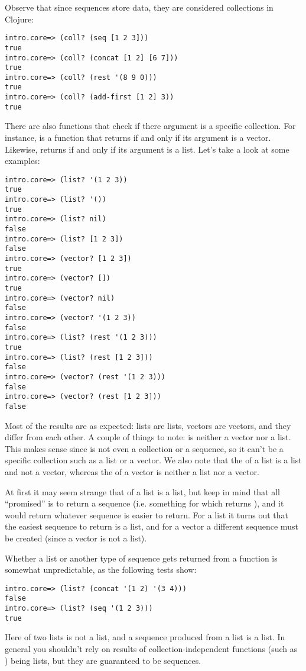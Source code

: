 Observe that since sequences store data, they are considered collections in Clojure:
\begin{framed}
\begin{verbatim}
intro.core=> (coll? (seq [1 2 3]))
true
intro.core=> (coll? (concat [1 2] [6 7]))
true
intro.core=> (coll? (rest '(8 9 0)))
true
intro.core=> (coll? (add-first [1 2] 3))
true
\end{verbatim}
\end{framed} 
There are also functions that check if there argument is a specific collection. For instance,  is a function that returns  if and only if its argument is a vector. Likewise,  returns  if and only if its argument is a list. Let's take a look at some examples:
\begin{framed}
\begin{verbatim}
intro.core=> (list? '(1 2 3))
true
intro.core=> (list? '())
true
intro.core=> (list? nil)
false
intro.core=> (list? [1 2 3])
false
intro.core=> (vector? [1 2 3])
true
intro.core=> (vector? [])
true
intro.core=> (vector? nil)
false
intro.core=> (vector? '(1 2 3))
false
intro.core=> (list? (rest '(1 2 3)))
true
intro.core=> (list? (rest [1 2 3]))
false
intro.core=> (vector? (rest '(1 2 3)))
false
intro.core=> (vector? (rest [1 2 3]))
false
\end{verbatim}
\end{framed} 
Most of the results are as expected: lists are lists, vectors are vectors, and they differ from each other. A couple of things to note:  is neither a vector nor a list. This makes sense since  is not even a collection or a sequence, so it can't be a specific collection such as a list or a vector. We also note that the  of a list is a list and not a vector, whereas the  of a vector is neither a list nor a vector.

At first it may seem strange that  of a list is a list, but keep in mind that all  ``promised'' is to return a sequence (i.e. something for which  returns ), and it would return whatever sequence is easier to return. For a list it turns out that the easiest sequence to return is a list, and for a vector a different sequence must be created (since a vector is not a list). 

Whether a list or another type of sequence gets returned from a function is somewhat unpredictable, as the following tests show:
\begin{framed}
\begin{verbatim}
intro.core=> (list? (concat '(1 2) '(3 4)))
false
intro.core=> (list? (seq '(1 2 3)))
true
\end{verbatim}
\end{framed} 
Here  of two lists is not a list, and a sequence produced from a list is a list. In general you shouldn't rely on results of collection-independent functions (such as ) being lists, but they are guaranteed to be sequences. 


